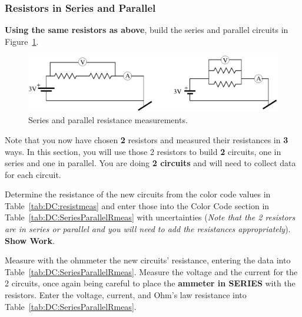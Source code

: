 \subsubsection{Resistors in Series and Parallel}

{\bf Using the same resistors as above}, build the series and 
parallel circuits in
Figure~\ref{fig:DC:procserpar}.  
\begin{figure}[htb]
\centering \epsfxsize=14cm \includegraphics[scale=0.7]{2_dc/procserpar.eps}
\caption{Series and parallel resistance measurements.}
\label{fig:DC:procserpar}
\end{figure}
Note that you now have 
chosen {\bf 2} resistors
and measured their resistances in {\bf 3} ways. In this section, you will
use those 2 resistors to build {\bf 2} circuits, one in series and one in
parallel.  You are doing {\bf 2 circuits} and will need to collect data 
for each circuit. 

Determine the resistance of the new circuits from the color code values
in Table~\ref{tab:DC:resistmeas} and enter those into the Color Code section in Table~\ref{tab:DC:SeriesParallelRmeas}
with uncertainties
({\it Note that the 2 resistors are in series
or parallel and you will need to add the resistances appropriately}). {\bf Show Work}.\\
\vspace*{4cm}

\noindent Measure with the ohmmeter the new circuits' resistance, entering the data into
Table~\ref{tab:DC:SeriesParallelRmeas}. Measure the  voltage and the current
for the 2 circuits, once again being careful to place the {\bf ammeter
in SERIES} with the resistors.  Enter the voltage, current, and Ohm's law 
resistance into Table~\ref{tab:DC:SeriesParallelRmeas}. \\
 \\

